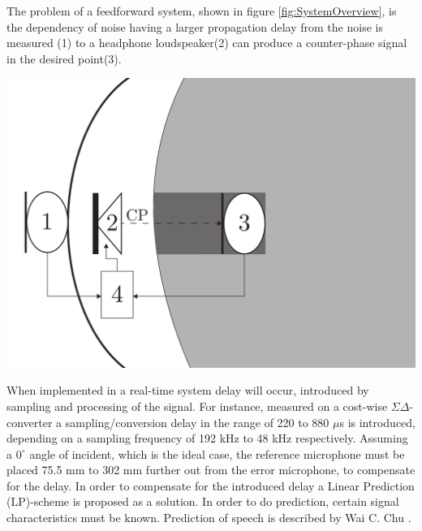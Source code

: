 The problem of a feedforward system, shown in figure \ref{fig:SystemOverview}, is the dependency of noise having a larger propagation delay from the noise is measured (1) to a headphone loudspeaker(2) can produce a counter-phase signal in the desired point(3). 

{
	\centering
	\includegraphics[width=1\columnwidth]{figures/ArticleIllustrations/BasicOverviewZoomed}
	\label{fig:SystemOverview}
}

When implemented in a real-time system delay will occur, introduced by sampling and processing of the signal. For instance, measured on a cost-wise $\Sigma\Delta$-converter a sampling/conversion delay in the range of 220 to 880 $\mu$s is introduced, depending on a sampling frequency of 192 kHz to 48 kHz respectively. Assuming a $\text{0}^{\circ}$ angle of incident, which is the ideal case, the reference microphone must be placed 75.5 mm to 302 mm further out from the error microphone, to compensate for the delay. In order to compensate for the introduced delay a Linear Prediction (LP)-scheme is proposed as a solution.
In order to do prediction, certain signal characteristics must be known. Prediction of speech is described by Wai C. Chu \cite{Speech}. 

